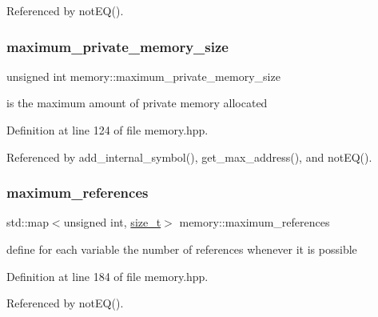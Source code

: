 Referenced by not\+E\+Q().

\mbox{\label{classmemory_a15e811711b1637eee51ca9f590adaec8}} 
\subsubsection{\texorpdfstring{maximum\+\_\+private\+\_\+memory\+\_\+size}{maximum\_private\_memory\_size}}
{\footnotesize\ttfamily unsigned int memory\+::maximum\+\_\+private\+\_\+memory\+\_\+size\hspace{0.3cm}{\ttfamily [private]}}



is the maximum amount of private memory allocated 



Definition at line 124 of file memory.\+hpp.



Referenced by add\+\_\+internal\+\_\+symbol(), get\+\_\+max\+\_\+address(), and not\+E\+Q().

\mbox{\label{classmemory_a268547b20b11daccd5d48b340c435915}} 
\subsubsection{\texorpdfstring{maximum\+\_\+references}{maximum\_references}}
{\footnotesize\ttfamily std\+::map$<$unsigned int, \hyperlink{tutorial__fpt__2017_2intro_2sixth_2test_8c_a7c94ea6f8948649f8d181ae55911eeaf}{size\+\_\+t}$>$ memory\+::maximum\+\_\+references\hspace{0.3cm}{\ttfamily [private]}}



define for each variable the number of references whenever it is possible 



Definition at line 184 of file memory.\+hpp.



Referenced by not\+E\+Q().

\mbox{\label{classmemory_ace0b7da6929aa5fb0a72f099e72eb0da}} 
